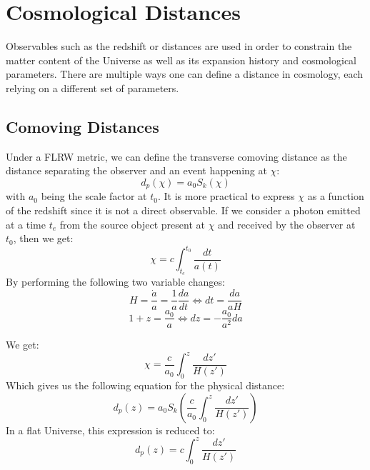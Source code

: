 \section{Cosmological Distances} \label{sec:cosmological_distances}

Observables such as the redshift or distances are used in order to constrain the matter content of the Universe as well as its expansion history and 
cosmological parameters. There are multiple ways one can define a distance in cosmology, each relying on a different set of parameters. \\

\subsection{Comoving Distances}

Under a FLRW metric, we can define the transverse comoving distance as the distance separating the observer and an event happening at $\chi$:
\begin{equation}
    d_p(\chi) = a_0 S_k(\chi)
\end{equation}
with $a_0$ being the scale factor at $t_0$. It is more practical to express $\chi$ as a function of the redshift since it is not a direct observable. If we consider a photon 
emitted at a time $t_e$ from the source object present at $\chi$ and received by the observer at $t_0$, then we get:
\begin{equation}
    \chi = c \int_{t_e}^{t_0} \frac{dt}{a(t)}
\end{equation}
By performing the following two variable changes:
\begin{equation}
    H = \frac{\dot{a}}{a} = \frac{1}{a} \frac{da}{dt} \Longleftrightarrow dt = \frac{da}{aH}
\end{equation}
\begin{equation}
    1+z = \frac{a_0}{a} \Longleftrightarrow dz = -\frac{a_0}{a^2}da
\end{equation}

We get:
\begin{equation}
    \chi = \frac{c}{a_0} \int_{0}^{z} \frac{dz'}{H(z')}
\end{equation}
Which gives us the following equation for the physical distance:
\begin{equation}
    \boxed{d_p(z) = a_0 S_k\left(\frac{c}{a_0} \int_{0}^{z} \frac{dz'}{H(z')}\right)}
\end{equation}
In a flat Universe, this expression is reduced to:
\begin{equation}
    d_p(z) = c \int_{0}^{z} \frac{dz'}{H(z')}
    \label{eqn:physical_distance}
\end{equation}

